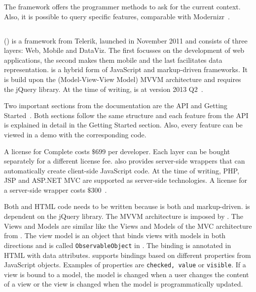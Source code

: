 \documentclass[a4paper]{artikel3}
\newcommand{\code}[1]{\texttt{#1}}
\newcommand{\setspace}[0]{\vspace{2mm}}
\renewcommand{\paragraph}[1]{\setspace \noindent {\bf #1}  }
\begin{document}
The framework offers the programmer methods to ask for the current context.
Also,  it is possible to query specific features,  comparable with Modernizr~\cite{Modernizr2012}.  


\subsection{\kendo} %
\label{sec:frameworks-kendo}

\kendo{} (\kendoa{}) is a framework from Telerik,  launched in November 2011 and consists of three layers:  Web,  Mobile and DataViz.
The first focusses on the development of web applications,  the second makes them mobile and the last facilitates data representation.
\kendoa{} is a hybrid form of JavaScript and markup-driven frameworks.
It is build upon the (Model-View-View Model) MVVM architecture and requires the jQuery library.
At the time of writing,  \kendoa{} is at version 2013 Q2~\cite{Telerike}. 

\paragraph{Documentation}
Two important sections from the documentation are the API and Getting Started~\cite{Telerikd}.
Both sections follow the same structure and each feature from the API is explained in detail in the Getting Started section.
Also,  every feature can be viewed in a demo with the corresponding code.

\paragraph{License}
A license for \kendoa{} Complete costs $\$699$ per developer.
Each layer can be bought separately for a different license fee.
\kendoa{} also provides server-side wrappers that can automatically create client-side JavaScript code.
At the time of writing, PHP,  JSP and ASP.NET MVC are supported as server-side technologies.
A license for a server-side wrapper costs $\$300$~\cite{Telerike}.

\paragraph{Code and development}
Both \js{} and HTML code needs to be written because \kendo{} is both \js{} and markup-driven.
\kendo{} is dependent on the jQuery library.
The MVVM architecture is imposed by \kendoa{}.
The Views and Models are similar like the Views and Models of the MVC architecture from \sta{}.
The view model is an object that binds views with models in both directions and is called \code{ObservableObject} in \kendoa{}.
The binding is annotated in HTML with data attributes.
\kendoa{} supports bindings based on different properties from JavaScript objects.
Examples of properties are \code{checked,  value} or \code{visible}.
If a view is bound to a model,  the model is changed when a user changes the content of a view or the view is changed when the model is programmatically updated.
\end{document}
